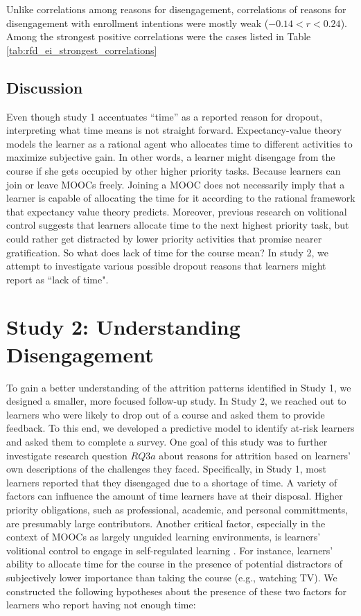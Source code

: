\documentclass{sigchi}\usepackage[]{graphicx}\usepackage[]{color}
\begin{document}
Unlike correlations among reasons for disengagement, correlations of reasons for disengagement with enrollment intentions were mostly weak ($-0.14 < r < 0.24$). Among the strongest positive correlations were the cases listed in Table \ref{tab:rfd_ei_strongest_correlations}


\subsection{Discussion}

Even though study 1 accentuates ``time'' as a reported reason for dropout, interpreting what time means is not straight forward. Expectancy-value theory models the learner as a rational agent who allocates time to different activities to maximize subjective gain. In other words, a learner might disengage from the course if she gets occupied by other higher priority tasks. Because learners can join or leave MOOCs freely. Joining a MOOC does not necessarily imply that a learner is capable of allocating the time for it according to the rational framework that expectancy value theory predicts. Moreover, previous research on volitional control suggests that learners allocate time to the next highest priority task, but could rather get distracted by lower priority activities that promise nearer gratification. So what does lack of time for the course mean? In study 2, we attempt to investigate various possible dropout reasons that learners might report as ``lack of time".


\section{Study 2: Understanding Disengagement}

To gain a better understanding of the attrition patterns identified in Study 1, we designed a smaller, more focused follow-up study. In Study 2, we reached out to learners who were likely to drop out of a course and asked them to provide feedback. To this end, we developed a predictive model to identify at-risk learners and asked them to complete a survey. One goal of this study was to further investigate research question $RQ3a$ about reasons for attrition based on learners' own descriptions of the challenges they faced. Specifically, in Study 1, most learners reported that they disengaged due to a shortage of time. A variety of factors can influence the amount of time learners have at their disposal. Higher priority obligations, such as professional, academic, and personal committments, are presumably large contributors. Another critical factor, especially in the context of MOOCs as largely unguided learning environments, is learners' volitional control to engage in self-regulated learning \cite{corno2001volitional}. For instance, learners' ability to allocate time for the course in the presence of potential distractors of subjectively lower importance than taking the course (e.g., watching TV). We constructed the following hypotheses about the presence of these two factors for learners who report having not enough time:
\end{document}
